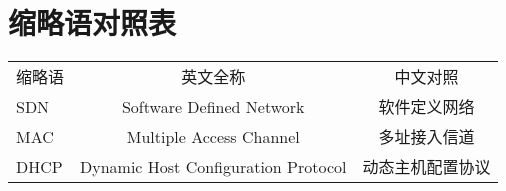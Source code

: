\chapter{缩略语对照表}
\begin{table}[!ht]
	\centering
	\begin{tabular}{l c c}	
		缩略语&英文全称&中文对照\\ 
		SDN &  Software Defined Network   & 软件定义网络\\
		MAC &  Multiple Access Channel  & 多址接入信道 \\ 
		DHCP &  Dynamic Host Configuration Protocol    & 动态主机配置协议 \\ 
	\end{tabular}
\end{table}